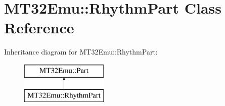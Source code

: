 \hypertarget{classMT32Emu_1_1RhythmPart}{\section{M\-T32\-Emu\-:\-:Rhythm\-Part Class Reference}
\label{classMT32Emu_1_1RhythmPart}
}
Inheritance diagram for M\-T32\-Emu\-:\-:Rhythm\-Part\-:\begin{figure}[H]
\begin{center}
\leavevmode
\includegraphics[height=2.000000cm]{classMT32Emu_1_1RhythmPart}
\end{center}
\end{figure}
